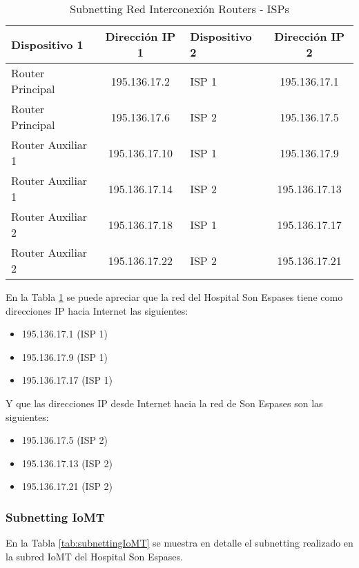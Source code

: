 \begin{table}[H]
    \centering
    \scriptsize
    \begin{tabular}{|l|c|l|c|}
        \hline
        \textbf{Dispositivo 1} & \textbf{Dirección IP 1} & \textbf{Dispositivo 2} & \textbf{Dirección IP 2}\\
        \hline
        Router Principal & 195.136.17.2 & ISP 1 & 195.136.17.1 \\
        \hline
        Router Principal & 195.136.17.6 & ISP 2 & 195.136.17.5 \\
        \hline
        Router Auxiliar 1 & 195.136.17.10 & ISP 1 & 195.136.17.9 \\
        \hline
        Router Auxiliar 1 & 195.136.17.14 & ISP 2 & 195.136.17.13 \\
        \hline
        Router Auxiliar 2 & 195.136.17.18 & ISP 1 & 195.136.17.17 \\
        \hline
        Router Auxiliar 2 & 195.136.17.22 & ISP 2 & 195.136.17.21 \\
        \hline
    \end{tabular}
    \caption{Subnetting Red Interconexión Routers - ISPs}
    \label{tab:InterconexionRouter-ISPSE}
\end{table}

En la Tabla \ref{tab:InterconexionRouter-ISPSE} se puede apreciar que la red del Hospital Son Espases tiene como direcciones IP hacia Internet las siguientes:
\begin{itemize}
    \item 195.136.17.1 (ISP 1)
    \item 195.136.17.9 (ISP 1)
    \item 195.136.17.17 (ISP 1)
\end{itemize}
Y que las direcciones IP desde Internet hacia la red de Son Espases son las siguientes:
\begin{itemize}
    \item 195.136.17.5 (ISP 2)
    \item 195.136.17.13 (ISP 2)
    \item 195.136.17.21 (ISP 2)
\end{itemize}

\subsubsection{Subnetting IoMT}
En la Tabla \ref{tab:subnettingIoMT} se muestra en detalle el subnetting realizado en la subred IoMT del Hospital Son Espases.

